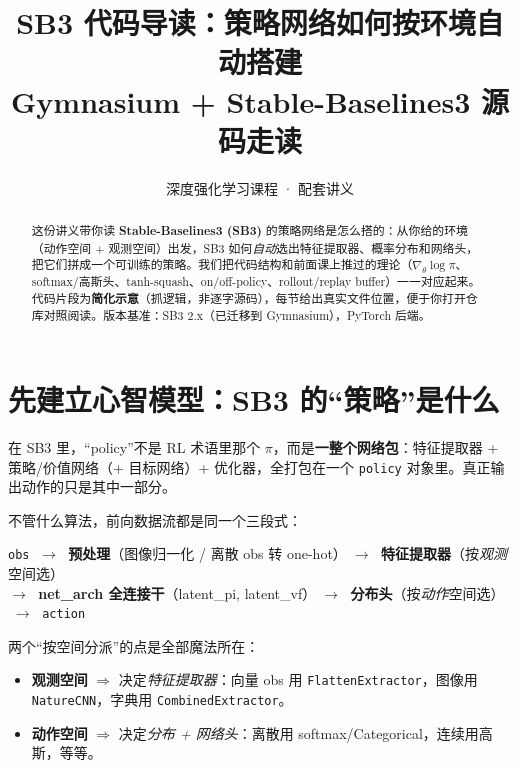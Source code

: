 \documentclass[11pt,a4paper]{article}
\title{\textbf{SB3 代码导读：策略网络如何按环境自动搭建}\\[2pt]
\large Gymnasium + Stable-Baselines3 源码走读}
\author{深度强化学习课程 · 配套讲义}
\date{}
\begin{document}
\maketitle

\begin{abstract}
\noindent 这份讲义带你读 \textbf{Stable-Baselines3 (SB3)} 的策略网络是怎么搭的：从你给的环境（动作空间 + 观测空间）出发，SB3 如何\emph{自动}选出特征提取器、概率分布和网络头，把它们拼成一个可训练的策略。我们把代码结构和前面课上推过的理论（$\nabla_\theta\log\pi$、softmax/高斯头、tanh-squash、on/off-policy、rollout/replay buffer）一一对应起来。代码片段为\textbf{简化示意}（抓逻辑，非逐字源码），每节给出真实文件位置，便于你打开仓库对照阅读。版本基准：SB3 2.x（已迁移到 Gymnasium），PyTorch 后端。
\end{abstract}

\section{先建立心智模型：SB3 的“策略”是什么}

\begin{keybox}[一句话]
在 SB3 里，“policy”不是 RL 术语里那个 $\pi$，而是\textbf{一整个网络包}：特征提取器 + 策略/价值网络（+ 目标网络）+ 优化器，全打包在一个 \texttt{policy} 对象里。真正输出动作的只是其中一部分。
\end{keybox}

不管什么算法，前向数据流都是同一个三段式：

\begin{center}
\begin{tcolorbox}[colback=gray!4,colframe=gray!50,width=0.95\linewidth]
\centering
\texttt{obs} $\;\to\;$ \textbf{预处理}（图像归一化 / 离散 obs 转 one-hot）$\;\to\;$
\textbf{特征提取器}（按\emph{观测}空间选）\\[2pt]
$\to\;$ \textbf{net\_arch 全连接干}（latent\_pi, latent\_vf）$\;\to\;$
\textbf{分布头}（按\emph{动作}空间选）$\;\to\;$ \texttt{action}
\end{tcolorbox}
\end{center}

两个“按空间分派”的点是全部魔法所在：

\begin{itemize}
\item \textbf{观测空间} $\Rightarrow$ 决定\emph{特征提取器}：向量 obs 用 \texttt{FlattenExtractor}，图像用 \texttt{NatureCNN}，字典用 \texttt{CombinedExtractor}。
\item \textbf{动作空间} $\Rightarrow$ 决定\emph{分布 + 网络头}：离散用 softmax/Categorical，连续用高斯，等等。
\end{itemize}
\end{document}
